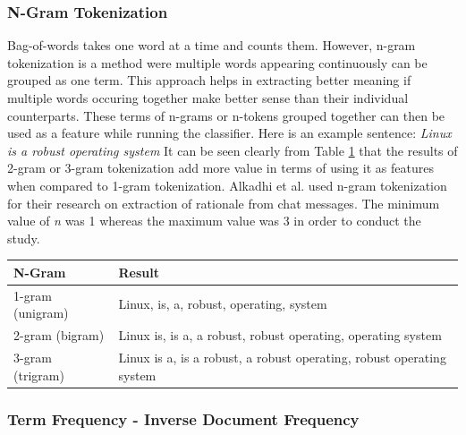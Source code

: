 \documentclass[a4paper,12pt,twoside]{report}
\begin{document}
\subsubsection{N-Gram Tokenization}
Bag-of-words takes one word at a time and counts them. However, n-gram tokenization is a method were multiple words appearing continuously can be grouped as one term. This approach helps in extracting better meaning if multiple words occuring together make better sense than their individual counterparts. These terms of n-grams or n-tokens grouped together can then be used as a feature while running the classifier. 
\bigbreak
Here is an example sentence: \textit{Linux is a robust operating system}
\bigbreak
It can be seen clearly from Table \ref{tab:ngramExample} that the results of 2-gram or 3-gram tokenization add more value in terms of using it as features when compared to 1-gram tokenization. Alkadhi et al.\cite{Alkadhi2017} used n-gram tokenization for their research on extraction of rationale from chat messages. The minimum value of \textit{n} was 1 whereas the maximum value was 3 in order to conduct the study. 
\begin{table} %
    \centering
    \begin{adjustbox}{max width=\columnwidth}
    \def\arraystretch{1} %
    \begin{tabular}{p{4cm} p{10cm}}
        \toprule
        \textbf{N-Gram} & \textbf{Result}\\
        \midrule
			1-gram (unigram) & Linux, is, a, robust, operating, system \\
			2-gram (bigram) & Linux is, is a, a robust, robust operating, operating system \\ 
			3-gram (trigram) & Linux is a, is a robust, a robust operating, robust operating system \\
        \midrule
    \end{tabular}
    \end{adjustbox}
    \label{tab:ngramExample}
\end{table}


\subsubsection{Term Frequency - Inverse Document Frequency}
\end{document}

